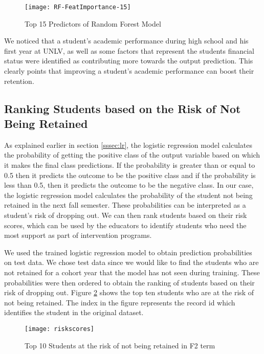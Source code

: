 \documentclass[11pt,openright]{report}
\begin{document}
 \begin{figure}
	\centering
	\texttt{[image: RF-FeatImportance-15]}
	\caption{Top 15 Predictors of Random Forest Model}
	\label{fig:rf_predictors}
\end{figure} 

We noticed that a student's academic performance during high school and his first year at UNLV, as well as some factors that represent the students financial status were identified as contributing more towards the output prediction. This clearly points that improving a student's academic performance can boost their retention.

\subsection{Ranking Students based on the Risk of Not Being Retained}
As explained earlier in section \ref{sssec:lr}, the logistic regression model calculates the probability of getting the positive class of the output variable based on which it makes the final class predictions. If the probability is greater than or equal to 0.5 then it predicts the outcome to be the positive class and if the probability is less than 0.5, then it predicts the outcome to be the negative class. In our case, the logistic regression model calculates the probability of the student not being retained in the next fall semester. These probabilities can be interpreted as a student's risk of dropping out. We can then rank students based on their risk scores, which can be used by the educators to identify students who need the most support as part of intervention programs. 

We used the trained logistic regression model to obtain prediction probabilities on test data. We chose test data since we would like to find the students who are not retained for a cohort year that the model has not seen during training. These probabilities were then ordered to obtain the ranking of students based on their risk of dropping out. Figure \ref{fig:risk_rank} shows the top ten students who are at the risk of not being retained. The index in the figure represents the record id which identifies the student in the original dataset.

 \begin{figure}[!htb]
	\centering
	\texttt{[image: riskscores]}
	\caption{Top 10 Students at the risk of not being retained in F2 term}
	\label{fig:risk_rank}
\end{figure} 
\end{document}
